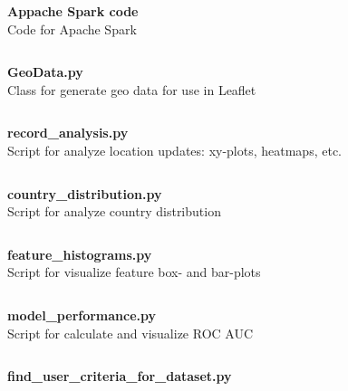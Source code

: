 \newpage
\textbf{\Large Appache Spark code}\\

Code for Apache Spark
\inputminted[mathescape,
               linenos,
               numbersep=5pt,
               gobble=2,
               frame=lines,
               framesep=2mm]{python}{../tools/template_new.py}

\newpage
\textbf{\Large GeoData.py}\\

Class for generate geo data for use in Leaflet
\inputminted[mathescape,
               linenos,
               numbersep=5pt,
               gobble=2,
               frame=lines,
               framesep=2mm]{python}{../tools/GeoData.py}

\newpage
\textbf{\Large record\_analysis.py}\\

Script for analyze location updates: xy-plots, heatmaps, etc.
\inputminted[mathescape,
               linenos,
               numbersep=5pt,
               gobble=2,
               frame=lines,
               framesep=2mm]{python}{../tools/scripts/records_analysis.py}

\newpage
\textbf{\Large country\_distribution.py}\\

Script for analyze country distribution
\inputminted[mathescape,
               linenos,
               numbersep=5pt,
               gobble=2,
               frame=lines,
               framesep=2mm]{python}{../tools/scripts/country_distribution.py}

\newpage
\textbf{\Large feature\_histograms.py}\\

Script for visualize feature box- and bar-plots
\inputminted[mathescape,
               linenos,
               numbersep=5pt,
               gobble=2,
               frame=lines,
               framesep=2mm]{python}{../tools/scripts/feature_histograms.py}

\newpage
\textbf{\Large model\_performance.py}\\

Script for calculate and visualize ROC AUC
\inputminted[mathescape,
               linenos,
               numbersep=5pt,
               gobble=2,
               frame=lines,
               framesep=2mm]{python}{../tools/scripts/model_performance.py}

\newpage
\textbf{\Large find\_user\_criteria\_for\_dataset.py}\\

